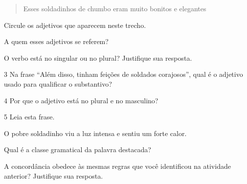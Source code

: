 \begin{quote}
Esses soldadinhos de chumbo eram muito bonitos e elegantes
\end{quote}

\begin{escolha}
\item
  Circule os adjetivos que aparecem neste trecho.


\item
  A quem esses adjetivos se referem?


\item O verbo está no singular ou no plural? Justifique sua resposta.

\end{escolha}

\num{3} Na frase ``Além disso, tinham feições de soldados corajosos'', qual é o
adjetivo usado para qualificar o substantivo?


\num{4} Por que o adjetivo está no plural e no masculino?


\num{5} Leia esta frase.

\begin{mdframed}[linewidth=10pt,linecolor=salmao!20,backgroundcolor=salmao!20,roundcorner=20pt]
O pobre soldadinho viu a luz intensa e sentiu um forte calor.
\end{mdframed}

\begin{escolha}
\item Qual é a classe gramatical da palavra destacada?


\item A concordância obedece às mesmas regras que você identificou na
  atividade anterior? Justifique sua resposta.

\end{escolha}

